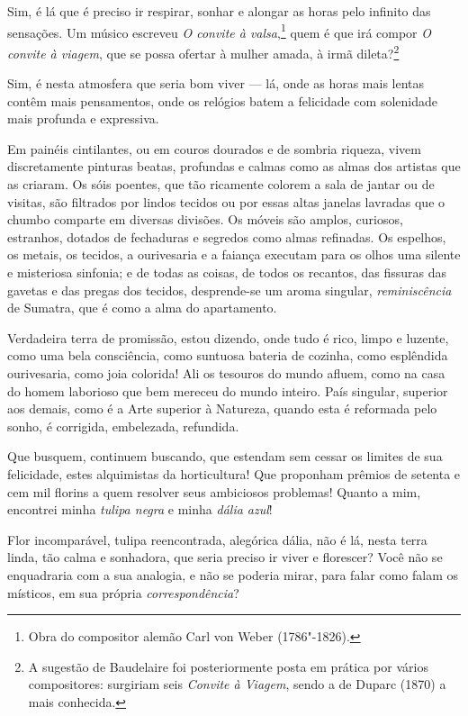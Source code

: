 Sim, é lá que é preciso ir respirar, sonhar e alongar as horas pelo
infinito das sensações. Um músico escreveu \textit{O convite à
valsa},\footnote{ Obra do compositor alemão Carl von Weber (1786"-1826).}
quem é que irá compor \textit{O convite à
viagem}, que se possa ofertar à mulher amada, à irmã
dileta?\footnote{ A sugestão de Baudelaire foi posteriormente posta em prática por
vários compositores: surgiriam seis \textit{Convite à Viagem}, sendo a de Duparc (1870) a
mais conhecida.}

Sim, é nesta atmosfera que seria bom viver --- lá, onde as horas mais
lentas contêm mais pensamentos, onde os relógios batem a felicidade
com solenidade mais profunda e expressiva.

Em painéis cintilantes, ou em couros dourados e de sombria riqueza,
vivem discretamente pinturas beatas, profundas e calmas como as almas
dos artistas que as criaram. Os sóis poentes, que tão ricamente colorem
a sala de jantar ou de visitas, são filtrados por lindos tecidos ou por
essas altas janelas lavradas que o chumbo comparte em diversas
divisões. Os móveis são amplos, curiosos, estranhos, dotados de
fechaduras e segredos como almas refinadas. Os espelhos, os metais, os
tecidos, a ourivesaria e a faiança executam para os olhos uma
silente e misteriosa sinfonia; e de todas as coisas, de todos os recantos, das
fissuras das gavetas e das pregas dos tecidos, desprende-se um aroma
singular, \textit{reminiscência} de Sumatra, que é como a alma do apartamento.

Verdadeira terra de promissão, estou dizendo, onde tudo é rico,
limpo e luzente, como uma bela consciência, como suntuosa bateria
de cozinha, como esplêndida ourivesaria, como joia colorida!
Ali os tesouros do mundo afluem, como na casa do homem laborioso
que bem mereceu do mundo inteiro. País singular, superior aos demais,
como é a Arte superior à Natureza, quando esta é reformada pelo sonho,
é corrigida, embelezada, refundida.

Que busquem, continuem buscando, que estendam sem cessar os limites de
sua felicidade, estes alquimistas da horticultura! Que proponham
prêmios de setenta e cem mil florins a quem resolver seus
ambiciosos problemas! Quanto a mim, encontrei minha \textit{tulipa negra} e
minha \textit{dália azul}!

Flor incomparável, tulipa reencontrada, alegórica dália, não é lá,
nesta terra linda, tão calma e sonhadora, que seria preciso ir viver e
florescer? Você não se enquadraria com a sua analogia, e não se
poderia mirar, para falar como falam os místicos, em sua própria
\textit{correspondência}?

